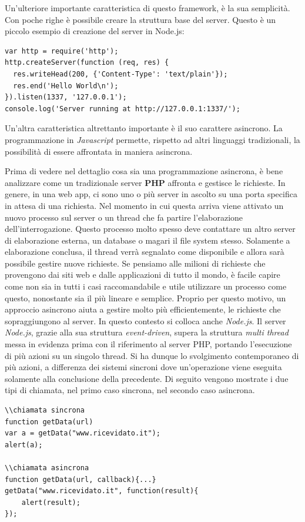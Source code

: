 Un'ulteriore importante caratteristica di questo framework, è la sua semplicità. Con poche righe è possibile creare la struttura base del server. Questo è un piccolo esempio di creazione del server in Node.js:

\begin{lstlisting}
var http = require('http');
http.createServer(function (req, res) {
  res.writeHead(200, {'Content-Type': 'text/plain'});
  res.end('Hello World\n');
}).listen(1337, '127.0.0.1');
console.log('Server running at http://127.0.0.1:1337/');
\end{lstlisting}

Un'altra caratteristica altrettanto importante è il suo carattere asincrono. La programmazione in \textit{Javascript} permette, rispetto ad altri linguaggi tradizionali, la possibilità di essere affrontata in maniera asincrona. 

Prima di vedere nel dettaglio cosa sia una programmazione asincrona, è bene analizzare come un tradizionale server \textbf{PHP} affronta e gestisce le richieste. In genere, in una web app, ci sono uno o più server in ascolto su una porta specifica in attesa di una richiesta. Nel momento in cui questa arriva viene attivato un nuovo processo sul server o un thread che fa partire l'elaborazione dell'interrogazione. Questo processo molto spesso deve contattare un altro server di elaborazione esterna, un database o magari il file system stesso. Solamente a elaborazione conclusa, il thread verrà segnalato come disponibile e allora sarà possibile gestire nuove richieste. Se pensiamo alle milioni di richieste che provengono dai siti web e dalle applicazioni di tutto il mondo, è facile capire come non sia in tutti i casi raccomandabile e utile utilizzare un processo come questo, nonostante sia il più lineare e semplice. Proprio per questo motivo, un approccio asincrono aiuta a gestire molto più efficientemente, le richieste che sopraggiungono al server. In questo contesto si colloca anche \textit{Node.js}. Il server \textit{Node.js}, grazie alla sua struttura \textit{event-driven}, supera la struttura \textit{multi thread} messa in evidenza prima con il riferimento al server PHP, portando l'esecuzione di più azioni su un singolo thread. Si ha dunque lo svolgimento contemporaneo di più azioni, a differenza dei sistemi sincroni dove un'operazione viene eseguita solamente alla conclusione della precedente. Di seguito vengono mostrate i due tipi di chiamata, nel primo caso sincrona, nel secondo caso asincrona.

\begin{lstlisting}
\\chiamata sincrona
function getData(url)
var a = getData("www.ricevidato.it");
alert(a);

\\chiamata asincrona
function getData(url, callback){...}
getData("www.ricevidato.it", function(result){
	alert(result);
});
\end{lstlisting}

